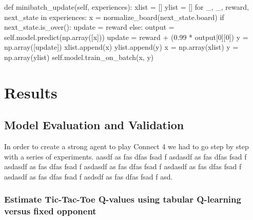 \documentclass{article}
\begin{document}
\begin{python}

    def minibatch_update(self, experiences):
        xlist = []
        ylist = []
        for _, _, reward, next_state in experiences:
            x = normalize_board(next_state.board)
            if next_state.is_over():
                update = reward
            else:
                output = self.model.predict(np.array([x]))
                update = reward + (0.99 * output[0][0])
            y = np.array([update])
            xlist.append(x)
            ylist.append(y)
        x = np.array(xlist)
        y = np.array(ylist)
        self.model.train_on_batch(x, y)
\end{python}

\pagebreak[4]

\section{Results}

\subsection{Model Evaluation and Validation}

In order to create a strong agent to play Connect 4 we had to go step by step with a series of
experiments. aasdf as fas dfas fsad f asdasdf as fas dfas fsad f asdasdf as fas dfas fsad f asdasdf
as fas dfas fsad f asdasdf as fas dfas fsad f asdasdf as fas dfas fsad f asdsdf as fas dfas fsad f
asd.

\subsubsection{Estimate Tic-Tac-Toe Q-values using tabular Q-learning versus fixed opponent}
\label{sec:tic-ql-tab-simple-fixed}

\end{document}
